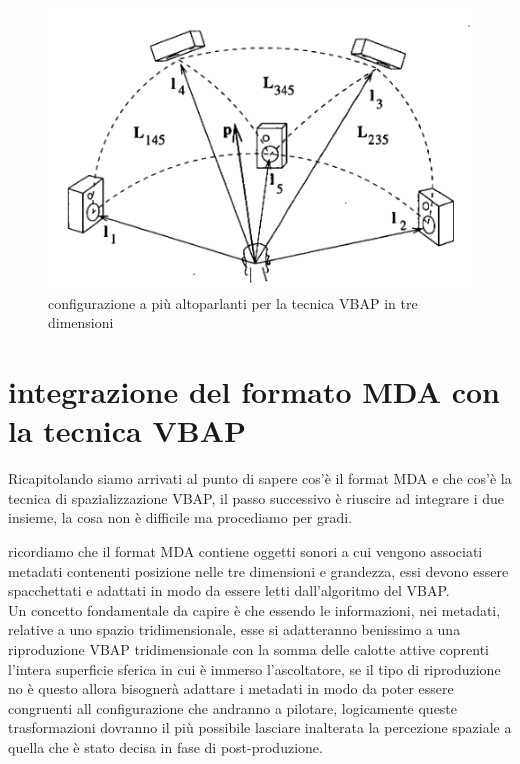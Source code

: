 \documentclass[12pt,a4paper]{report}
\begin{document}
\begin{figure}[htbp]
	\centering
	\includegraphics[scale=0.40]{figures/matrix3dfull.png}
	\caption {configurazione a più altoparlanti per la tecnica VBAP in tre dimensioni} 
	\label{fig:matrix3dfull}
	\end{figure}


\section{integrazione del formato MDA con la tecnica VBAP}

Ricapitolando siamo arrivati al punto di sapere cos'è il format MDA e che cos'è la tecnica di spazializzazione VBAP, 
il passo successivo è riuscire ad integrare i due insieme, la cosa non è difficile ma procediamo per gradi.


ricordiamo che il format MDA contiene oggetti sonori a cui vengono associati metadati contenenti posizione nelle tre dimensioni e grandezza, essi devono essere spacchettati e adattati in modo da essere letti dall'algoritmo del VBAP.\\

Un concetto fondamentale da capire è che essendo le informazioni, nei metadati, relative a uno spazio tridimensionale, esse si adatteranno benissimo a una riproduzione VBAP tridimensionale con la somma delle calotte attive coprenti l'intera superficie sferica in cui è immerso l'ascoltatore, se il tipo di riproduzione no è questo allora bisognerà adattare i metadati in modo da poter essere congruenti all configurazione che andranno a pilotare, logicamente queste trasformazioni dovranno il più possibile lasciare inalterata la percezione spaziale a quella che è stato decisa in fase di post-produzione.\\
\end{document}
